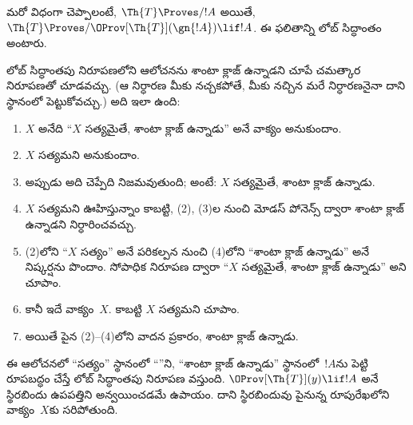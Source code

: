 \documentclass[../../../include/open-logic-section]{subfiles}
\begin{document}
మరో విధంగా చెప్పాలంటే, $\Th{T} \Proves/ !A$ అయితే,
$\Th{T} \Proves/ \OProv[\Th{T}](\gn{!A}) \lif !A$. ఈ ఫలితాన్ని లోబ్
సిద్ధాంతం అంటారు.

\begin{explain}
లోబ్ సిద్ధాంతపు నిరూపణలోని ఆలోచనను శాంటా క్లాజ్ ఉన్నాడని చూపే
చమత్కార నిరూపణతో చూడవచ్చు. (ఆ నిర్ధారణ మీకు నచ్చకపోతే, మీకు నచ్చిన మరే నిర్ధారణనైనా
దాని స్థానంలో పెట్టుకోవచ్చు.) అది ఇలా ఉంది:
\begin{enumerate}
\item $X$ అనేది ``$X$ సత్యమైతే, శాంటా క్లాజ్ ఉన్నాడు'' అనే వాక్యం అనుకుందాం.
\item $X$ సత్యమని అనుకుందాం.
\item అప్పుడు అది చెప్పేది నిజమవుతుంది; అంటే: $X$ సత్యమైతే, శాంటా క్లాజ్
  ఉన్నాడు.
\item $X$ సత్యమని ఊహిస్తున్నాం కాబట్టి, (2), (3)ల నుంచి మోడస్ పోనెన్స్ ద్వారా
  శాంటా క్లాజ్ ఉన్నాడని నిర్ధారించవచ్చు.
\item (2)లోని ``$X$ సత్యం'' అనే పరికల్పన నుంచి (4)లోని ``శాంటా క్లాజ్
ఉన్నాడు'' అనే నిష్కర్షను పొందాం. సోపాధిక నిరూపణ ద్వారా ``$X$ సత్యమైతే,
  శాంటా క్లాజ్ ఉన్నాడు'' అని చూపాం.
\item కానీ ఇదే వాక్యం~$X$. కాబట్టి $X$ సత్యమని చూపాం.
\item అయితే పైన (2)--(4)లోని వాదన ప్రకారం, శాంటా క్లాజ్ ఉన్నాడు.
\end{enumerate}
ఈ ఆలోచనలో ``సత్యం'' స్థానంలో ``''ని, ``శాంటా క్లాజ్
ఉన్నాడు'' స్థానంలో~$!A$ను పెట్టి రూపబద్ధం చేస్తే లోబ్ సిద్ధాంతపు నిరూపణ
వస్తుంది. $\OProv[\Th{T}](y) \lif !A$ అనే  స్థిరబిందు
ఉపపత్తిని అన్వయించడమే ఉపాయం. దాని స్థిరబిందువు పైనున్న రూపురేఖలోని
వాక్యం~$X$కు సరిపోతుంది.
\end{explain}
\end{document}
